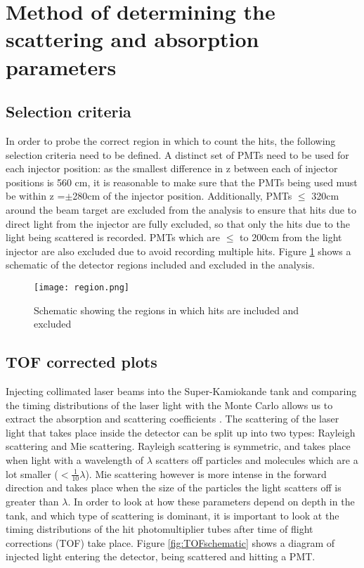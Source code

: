 \documentclass[11pt,oneside,a4paper]{article}
\begin{document}
\section{Method of determining the scattering and absorption parameters}
\subsection{Selection criteria}
In order to probe the correct region in which to count the hits, the following selection criteria need to be defined. A distinct set of PMTs need to be used for each injector position: as the smallest difference in z between each of injector positions is 560 cm, it is reasonable to make sure that the PMTs being used must be within z =$\pm$280cm of the injector position. Additionally, PMTs $\leq$ 320cm around the beam target are excluded from the analysis to ensure that hits due to direct light from the injector are fully excluded, so that only the hits due to the light being scattered is recorded. PMTs which are $\leq$ to 200cm from the light injector are also excluded due to avoid recording multiple hits. Figure \ref{fig:region} shows a schematic of the detector regions included and excluded in the analysis.

\begin{figure}[htbp]
	\centering
	\texttt{[image: region.png]}
	\caption{Schematic showing the regions in which hits are included and excluded}
	\label{fig:region}
\end{figure}


 



\subsection{TOF corrected plots}
Injecting collimated laser beams into the Super-Kamiokande tank and comparing the timing distributions of the laser light with the Monte Carlo allows us to extract the absorption and scattering coefficients \cite{skcalibration}. The scattering of the laser light that takes place inside the detector can be split up into two types: Rayleigh scattering and Mie scattering. Rayleigh scattering is symmetric, and takes place when light with a wavelength of $\lambda$ scatters off particles and molecules which are a lot smaller ($<\frac{1}{10}\lambda$). Mie scattering however is more intense in the forward direction and takes place when the size of the particles the light scatters off is greater than $\lambda$. In order to look at how these parameters depend on depth in the tank, and which type of scattering is dominant, it is important to look at the timing distributions of the hit photomultiplier tubes after time of flight corrections (TOF) take place. Figure \ref{fig:TOFschematic} shows a diagram of injected light entering the detector, being scattered and hitting a PMT.
\end{document}
